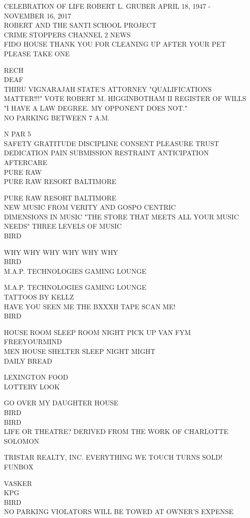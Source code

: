 \documentclass[10pt,letterpaper]{article}
\begin{document}
CELEBRATION OF LIFE ROBERT L. GRUBER APRIL 18, 1947 {-} NOVEMBER 16, 2017\\
ROBERT AND THE SANTI SCHOOL PROJECT\\
CRIME STOPPERS CHANNEL 2 NEWS\\
FIDO HOUSE THANK YOU FOR CLEANING UP AFTER YOUR PET PLEASE TAKE ONE

RECH\\
DEAF\\
THIRU VIGNARAJAH STATE'S ATTORNEY "QUALIFICATIONS MATTER!!!" VOTE ROBERT M. HIGGINBOTHAM II REGISTER OF WILLS "I HAVE A LAW DEGREE.  MY OPPONENT DOES NOT."\\
NO PARKING BETWEEN 7 A.M.

N PAR 5\\
SAFETY GRATITUDE DISCIPLINE CONSENT PLEASURE TRUST DEDICATION PAIN SUBMISSION RESTRAINT ANTICIPATION AFTERCARE\\
PURE RAW\\
PURE RAW RESORT BALTIMORE

PURE RAW RESORT BALTIMORE\\
NEW MUSIC FROM VERITY AND GOSPO CENTRIC\\
DIMENSIONS IN MUSIC "THE STORE THAT MEETS ALL YOUR MUSIC NEEDS" THREE LEVELS OF MUSIC\\
BIRD

WHY WHY WHY WHY WHY WHY\\
BIRD\\
M.A.P. TECHNOLOGIES GAMING LOUNGE

M.A.P. TECHNOLOGIES GAMING LOUNGE\\
TATTOOS BY KELLZ\\
HAVE YOU SEEN ME THE BXXXH TAPE SCAN ME!\\
BIRD

HOUSE ROOM SLEEP ROOM NIGHT PICK UP VAN FYM FREEYOURMIND\\
MEN HOUSE SHELTER SLEEP NIGHT MIGHT\\
DAILY BREAD

LEXINGTON FOOD\\
LOTTERY LOOK

GO OVER MY DAUGHTER HOUSE\\
BIRD\\
BIRD\\
LIFE OR THEATRE? DERIVED FROM THE WORK OF CHARLOTTE SOLOMON

TRISTAR REALTY, INC. EVERYTHING WE TOUCH TURNS SOLD!\\
FUNBOX

VASKER\\
KPG\\
BIRD\\
NO PARKING VIOLATORS WILL BE TOWED AT OWNER'S EXPENSE
\end{document}
